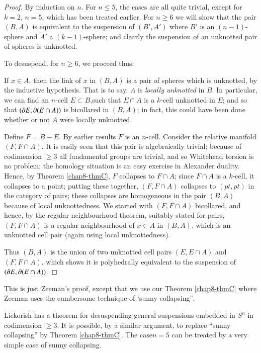 \begin{proof}
By induction on $n$. For $n\leq 5$, the cases are all quite trivial, except for $k=2$, $n=5$, which has been treated earlier. For $n\geq 6$ we will show that the pair $(B,A)$ is equivalent to the suspension of $(B',A')$ where $B'$ is an $(n-1)$-sphere and $A'$ a $(k-1)$-sphere; and clearly the suspension of an unknotted pair of spheres is unknotted.

To desuspend, for $n\geq 6$, we proceed thus:

If $x\in A$, then the link of $x$ in $(B,A)$ is a pair of spheres which is unknotted, by the inductive hypothesis. That is to say, $A$ is {\em locally unknotted} in $B$. In particular, we can find an $n$-cell $E\subset B$,\pageoriginale such that $E\cap A$ is a $k$-cell unknotted in $E$; and so that $(\partial E, \partial(E\cap A))$ is bicollared in $(B,A)$; in fact, this could have been done whether or not $A$ were locally unknotted.

Define $F=\overline{B-E}$. By earlier results $F$ is an $n$-cell. Consider the relative manifold $(F,F\cap A)$. It is easily seen that this pair is algebraically trivial; because of codimension $\geq 3$ all fundamental groups are trivial, and so Whitehead torsion is no problem; the homology situation is an easy exercise in Alexander duality. Hence, by Theorem \ref{chap8-thmC}, $F$ collapses to $F\cap A$; since $F\cap A$ is a $k$-cell, it collapses to a point; putting these together, $(F,F\cap A)$ collapses to $(pt,pt)$ in the category of pairs; these collapses are homogeneous in the pair $(B,A)$ because of local unknottedness. We started with $(F,F\cap A)$ bicollared, and hence, by the regular 
neighbourhood theorem, suitably stated for pairs, $(F,F\cap A)$ is a regular neighbourhood of $x\in A$ in $(B,A)$, which is an unknotted cell pair (again using local unknottedness).

Thus $(B,A)$ is the union of two unknotted cell pairs $(E,E\cap A)$ and $(F,F\cap A)$, which shows it is polyhedrally equivalent to the suspension of $(\partial E, \partial (E\cap A))$.
\end{proof}

\begin{rem}\label{chap8-rem1}
This is just Zeeman's proof, except that we use our Theorem \ref{chap8-thmC} where Zeeman uses the cumbersome technique of `sunny collapsing''.
\end{rem}

\begin{rem}\label{chap8-rem2}%
Lickorish has a theorem for desuspending general suspensions embedded in $S^{n}$ in codimension $\geq 3$. It is possible, by a similar argument, to replace ``sunny collapsing'' by Theorem \ref{chap8-thmC}. The case\pageoriginale $n=5$ can be treated by a very simple case of sunny collapsing.
\end{rem}

